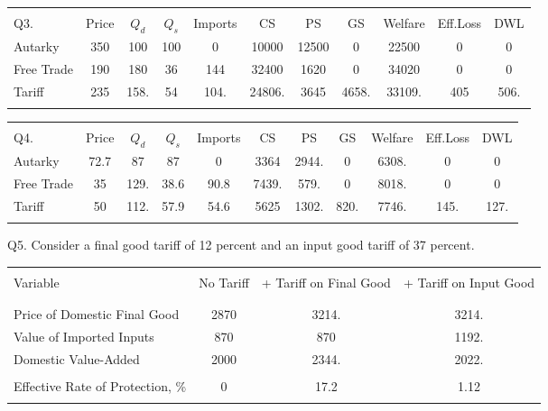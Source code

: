 \documentclass[12pt]{article}
\begin{document}
\begin{table}[!h]
	\centering
	\begin{tabular}[t]{l c c c c c c c c c c }
		\hline
		&&&&&&&&&&  \\
		Q3.	& Price & $Q_d$ & $Q_s$ & Imports & CS & PS & GS & Welfare & Eff.Loss & DWL \\
		Autarky &  350 & 100 & 100& 0  & 10000 & 12500 & 0   & 22500 &  0 & 0\\ 
		Free Trade &  190 & 180 &  36 & 144 &  32400   & 1620 & 0 &  34020 & 0 & 0 \\
		Tariff & 235 & 158. & 54 & 104. & 24806. & 3645 & 4658. & 33109. & 405 & 506.\\
		&&&&&&&&&& \\
		\hline
	\end{tabular}
\end{table}
\begin{table}[!h]
	\centering
	\begin{tabular}[t]{l c c c c c c c c c c }
		\hline
		&&&&&&&&&&  \\
		Q4.	& Price & $Q_d$ & $Q_s$ & Imports & CS & PS & GS & Welfare & Eff.Loss & DWL \\
		Autarky &   72.7  & 87  &  87  & 0 & 3364 & 2944. & 0   & 6308.&  0 & 0 \\
		Free Trade & 35  & 129. & 38.6 & 90.8 & 7439. & 579.  &  0 &  8018.&  0 &  0 \\
		Tariff & 50  & 112. & 57.9 & 54.6 & 5625  & 1302. & 820.  & 7746. & 145. & 127. \\
		&&&&&&&&&& \\
		\hline
	\end{tabular}
\end{table}

\newpage

\bigskip

\noindent Q5. Consider a final good tariff of 12 percent and an input good tariff of 37 percent.

\begin{table}[!h]
	\centering
	\begin{tabular}[t]{l c c c}
		\hline
		&&&\\
		Variable & No Tariff & + Tariff on Final Good & + Tariff on Input Good \\
		&&&\\
		\hline
		&&&\\
		Price of Domestic Final Good & 2870 & 3214. &  3214. \\
		Value of Imported Inputs & 870 & 870 & 1192. \\
		Domestic Value-Added &	2000	& 2344. & 2022.\\
		&&&\\
		Effective Rate of Protection, \% &	0	&	 17.2 	&	1.12 \\
		&&&\\
		\hline
	\end{tabular}
\end{table}
\end{document}
